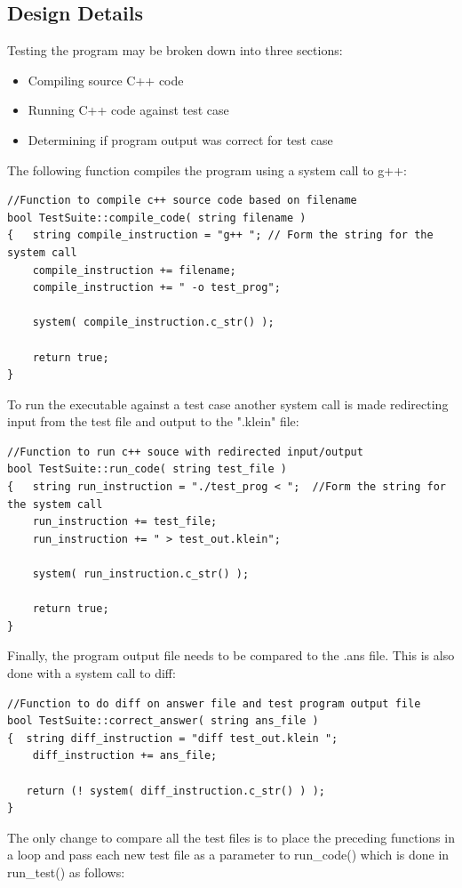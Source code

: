 \subsection{Design Details}
Testing the program may be broken down into three sections:
\begin{itemize}
	\item Compiling source C++ code
	\item Running C++ code against test case
	\item Determining if program output was correct for test case
\end{itemize}
The following function compiles the program using a system call to g++:
\begin{lstlisting}
//Function to compile c++ source code based on filename
bool TestSuite::compile_code( string filename )
{   string compile_instruction = "g++ "; // Form the string for the system call
    compile_instruction += filename;
    compile_instruction += " -o test_prog";

    system( compile_instruction.c_str() );

    return true;
}\end{lstlisting}
To run the executable against a test case another system call is made redirecting input from the test file and output to the ".klein" file:
\begin{lstlisting}
//Function to run c++ souce with redirected input/output
bool TestSuite::run_code( string test_file )
{   string run_instruction = "./test_prog < ";  //Form the string for the system call
    run_instruction += test_file;
    run_instruction += " > test_out.klein";

    system( run_instruction.c_str() );

    return true;
}
\end{lstlisting}
Finally, the program output file needs to be compared to the .ans file. This is also done with a system call to diff:
\begin{lstlisting}
//Function to do diff on answer file and test program output file
bool TestSuite::correct_answer( string ans_file )
{  string diff_instruction = "diff test_out.klein ";
    diff_instruction += ans_file;
 
   return (! system( diff_instruction.c_str() ) );
}
\end{lstlisting}
The only change to compare all the test files is to place the preceding functions in a loop and pass each new test file as a parameter to run\_code() which is done in run\_test() as follows:
